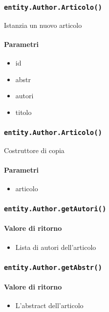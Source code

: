 \subsubsection{\texttt{entity.Author.Articolo()}}
Istanzia un nuovo articolo
\paragraph{Parametri}
\begin{itemize}
\item id
\item abstr
\item autori
\item titolo
\end{itemize}

\subsubsection{\texttt{entity.Author.Articolo()}}
Costruttore di copia
\paragraph{Parametri}
\begin{itemize}
\item articolo
\end{itemize}

\subsubsection{\texttt{entity.Author.getAutori()}}
\paragraph{Valore di ritorno}
\begin{itemize}
\item Lista di autori dell'articolo
\end{itemize}

\subsubsection{\texttt{entity.Author.getAbstr()}}
\paragraph{Valore di ritorno}
\begin{itemize}
\item L'abstract dell'articolo
\end{itemize}

